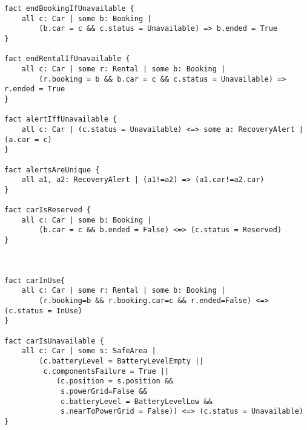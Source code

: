 \begin{lstlisting}
fact endBookingIfUnavailable {
	all c: Car | some b: Booking |
		(b.car = c && c.status = Unavailable) => b.ended = True
}

fact endRentalIfUnavailable {
	all c: Car | some r: Rental | some b: Booking |
		(r.booking = b && b.car = c && c.status = Unavailable) => r.ended = True
}

fact alertIffUnavailable {
	all c: Car | (c.status = Unavailable) <=> some a: RecoveryAlert | (a.car = c)
}

fact alertsAreUnique {
	all a1, a2: RecoveryAlert | (a1!=a2) => (a1.car!=a2.car)
}

fact carIsReserved {
	all c: Car | some b: Booking |
		(b.car = c && b.ended = False) <=> (c.status = Reserved)
}



fact carInUse{
	all c: Car | some r: Rental | some b: Booking |
		(r.booking=b && r.booking.car=c && r.ended=False) <=> (c.status = InUse)
}

fact carIsUnavailable {
	all c: Car | some s: SafeArea |
		(c.batteryLevel = BatteryLevelEmpty ||
		 c.componentsFailure = True || 
			(c.position = s.position &&
			 s.powerGrid=False &&
			 c.batteryLevel = BatteryLevelLow &&
			 s.nearToPowerGrid = False)) <=> (c.status = Unavailable)
}
\end{lstlisting}
